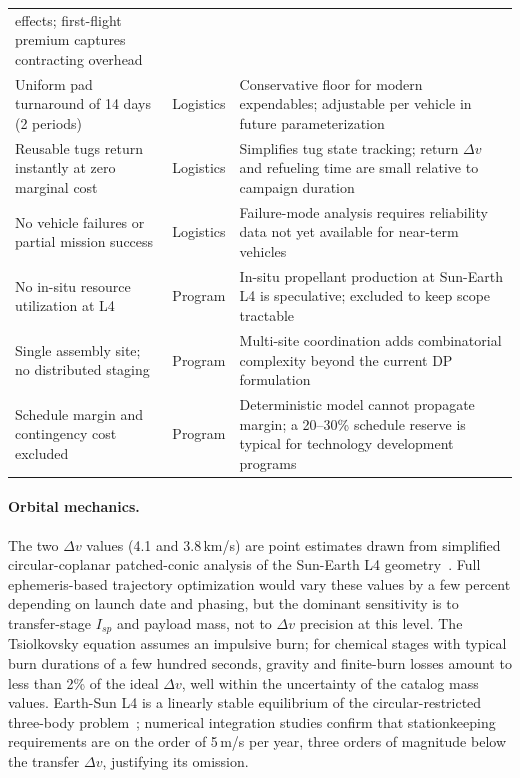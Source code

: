 \begin{table}[htbp]
\begin{tabular}{p{4.5cm}lp{5.5cm}}
    effects; first-flight premium captures contracting overhead \\
Uniform pad turnaround of 14 days (2 periods)
  & Logistics & Conservative floor for modern expendables;
    adjustable per vehicle in future parameterization \\
Reusable tugs return instantly at zero marginal cost
  & Logistics & Simplifies tug state tracking; return $\Delta v$
    and refueling time are small relative to campaign duration \\
No vehicle failures or partial mission success
  & Logistics & Failure-mode analysis requires reliability data
    not yet available for near-term vehicles \\
\midrule
No in-situ resource utilization at L4
  & Program & In-situ propellant production at Sun-Earth L4 is
    speculative; excluded to keep scope tractable \\
Single assembly site; no distributed staging
  & Program & Multi-site coordination adds combinatorial
    complexity beyond the current DP formulation \\
Schedule margin and contingency cost excluded
  & Program & Deterministic model cannot propagate margin;
    a 20--30\% schedule reserve is typical for technology
    development programs \\
\bottomrule
\end{tabular}
\end{table}

\paragraph{Orbital mechanics.}
The two $\Delta v$ values (4.1 and 3.8\,km/s) are point estimates
drawn from simplified circular-coplanar patched-conic analysis of
the Sun-Earth L4 geometry~\cite{folta_l4_transfers}. Full
ephemeris-based trajectory optimization would vary these values
by a few percent depending on launch date and phasing, but the
dominant sensitivity is to transfer-stage $I_{sp}$ and payload
mass, not to $\Delta v$ precision at this level. The Tsiolkovsky
equation assumes an impulsive burn; for chemical stages with
typical burn durations of a few hundred seconds, gravity and
finite-burn losses amount to less than 2\% of the ideal
$\Delta v$, well within the uncertainty of the catalog mass
values. Earth-Sun L4 is a linearly stable equilibrium of the
circular-restricted three-body problem~\cite{l4_stability};
numerical integration studies confirm that stationkeeping
requirements are on the order of 5\,m/s per year, three orders
of magnitude below the transfer $\Delta v$, justifying its
omission.

